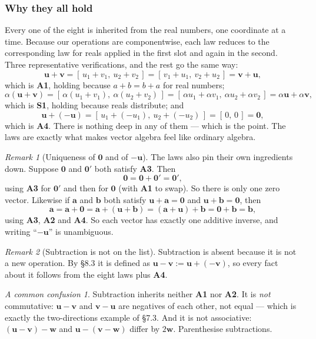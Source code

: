 \documentclass[11pt]{article}
\theoremstyle{definition}
\theoremstyle{remark}
\newtheorem*{rmk}{Remark}
\newtheorem*{warn}{A common confusion}
\newcommand{\vc}[1]{\mathbf{#1}}
\begin{document}
\subsubsection*{Why they all hold}
Every one of the eight is inherited from the real numbers, one coordinate at a
time. Because our operations are componentwise, each law reduces to the
corresponding law for reals applied in the first slot and again in the second.
Three representative verifications, and the rest go the same way:
\[
  \vc{u}+\vc{v}
  = [\,u_1+v_1,\ u_2+v_2\,]
  = [\,v_1+u_1,\ v_2+u_2\,]
  = \vc{v}+\vc{u} ,
\]
which is \textbf{A1}, holding because $a+b=b+a$ for real numbers;
\[
  \alpha(\vc{u}+\vc{v})
  = [\,\alpha(u_1+v_1),\ \alpha(u_2+v_2)\,]
  = [\,\alpha u_1+\alpha v_1,\ \alpha u_2+\alpha v_2\,]
  = \alpha\vc{u}+\alpha\vc{v} ,
\]
which is \textbf{S1}, holding because reals distribute; and
\[
  \vc{u}+(-\vc{u})
  = [\,u_1+(-u_1),\ u_2+(-u_2)\,]
  = [\,0,\,0\,]
  = \vc{0} ,
\]
which is \textbf{A4}. There is nothing deep in any of them --- which is the
point. The laws are exactly what makes vector algebra feel like ordinary algebra.

\begin{rmk}[Uniqueness of $\vc{0}$ and of $-\vc{u}$]
The laws also pin their own ingredients down. Suppose $\vc{0}$ and $\vc{0}'$
both satisfy \textbf{A3}. Then
\[
  \vc{0} = \vc{0}+\vc{0}' = \vc{0}' ,
\]
using \textbf{A3} for $\vc{0}'$ and then for $\vc{0}$ (with \textbf{A1} to
swap). So there is only one zero vector. Likewise if $\vc{a}$ and $\vc{b}$ both
satisfy $\vc{u}+\vc{a}=\vc{0}$ and $\vc{u}+\vc{b}=\vc{0}$, then
\[
  \vc{a} = \vc{a}+\vc{0} = \vc{a}+(\vc{u}+\vc{b})
         = (\vc{a}+\vc{u})+\vc{b} = \vc{0}+\vc{b} = \vc{b} ,
\]
using \textbf{A3}, \textbf{A2} and \textbf{A4}. So each vector has exactly one
additive inverse, and writing ``$-\vc{u}$'' is unambiguous.
\end{rmk}

\begin{rmk}[Subtraction is not on the list]
Subtraction is absent because it is not a new operation. By \S8.3 it is defined
as $\vc{u}-\vc{v}:=\vc{u}+(-\vc{v})$, so every fact about it follows from the
eight laws plus \textbf{A4}.
\end{rmk}

\begin{warn}
Subtraction inherits neither \textbf{A1} nor \textbf{A2}. It is
\emph{not} commutative: $\vc{u}-\vc{v}$ and $\vc{v}-\vc{u}$ are negatives of
each other, not equal --- which is exactly the two-directions example of \S7.3.
And it is not associative: $(\vc{u}-\vc{v})-\vc{w}$ and
$\vc{u}-(\vc{v}-\vc{w})$ differ by $2\vc{w}$. Parenthesise subtractions.
\end{warn}
\end{document}

